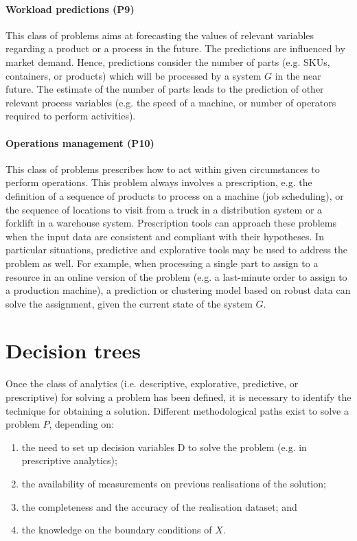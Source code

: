 \paragraph{Workload predictions (P9)}
This class of problems aims at forecasting the values of relevant variables regarding a product or a process in the future. The predictions are influenced by market demand. Hence, predictions consider the number of parts (e.g. SKUs, containers, or products) which will be processed by a system $G$ in the near future. The estimate of the number of parts leads to the prediction of other relevant process variables (e.g. the speed of a machine, or number of operators required to perform activities).

\paragraph{Operations management (P10)}
This class of problems prescribes how to act within given circumstances to perform operations. This problem always involves a prescription, e.g. the definition of a sequence of products to process on a machine (job scheduling), or the sequence of locations to visit from a truck in a distribution system or a forklift in a warehouse system. Prescription tools can approach these problems when the input data are consistent and compliant with their hypotheses. In particular situations, predictive and explorative tools may be used to address the problem as well. For example, when processing a single part to assign to a resource in an online version of the problem (e.g. a last-minute order to assign to a production machine), a prediction or clustering model based on robust data can solve the assignment, given the current state of the system $G$.

\section{Decision trees}
Once the class of analytics (i.e. descriptive, explorative, predictive, or prescriptive) for solving a problem has been defined, it is necessary to identify the technique for obtaining a solution. Different methodological paths exist to solve a problem $P$, depending on:

\begin{enumerate}
    \item the need to set up decision variables D to solve the problem (e.g. in prescriptive analytics);
	\item the availability of measurements on previous realisations of the solution;
	\item the completeness and the accuracy of the realisation dataset; and
	\item the knowledge on the boundary conditions of $X$.

\end{enumerate}


